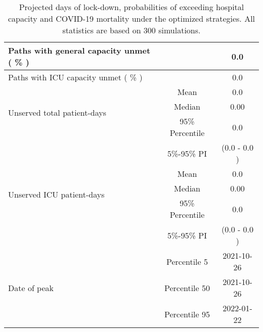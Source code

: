 \documentclass{article}
\begin{document}
\begin{table}[th]
\begin{tabular}{p{4cm}cc}
\multirow{1}{*}{Paths with general capacity unmet ( \% )} &      &         0.0              \\   \midrule 
\multirow{1}{*}{Paths with ICU capacity unmet ( \% )} &      &         0.0              \\   \midrule 
\multirow{3}{\hsize}{Unserved total patient-days} & Mean & 0.0  \\ \cmidrule(l){2-3}
									& Median & 0.00  \\ \cmidrule(l){2-3} 
									& 95\% Percentile     & 0.0    \\ \cmidrule(l){2-3} 
									& 5\%-95\% PI & (0.0 - 0.0 )       \\ \midrule
\multirow{3}{\hsize}{Unserved ICU patient-days} & Mean & 0.0  \\ \cmidrule(l){2-3}
									& Median & 0.00  \\ \cmidrule(l){2-3} 
									& 95\% Percentile     & 0.0    \\ \cmidrule(l){2-3} 
									& 5\%-95\% PI & (0.0 - 0.0 )       \\ \midrule
									
\multirow{3}{\hsize}{Date of peak}   & Percentile 5      & 2021-10-26   \\ \cmidrule(l){2-3} 
                                     & Percentile 50     & 2021-10-26    \\ \cmidrule(l){2-3} 
                                     & Percentile 95     & 2022-01-22     \\  \bottomrule

\end{tabular}
\caption{Projected days of lock-down, probabilities of exceeding hospital capacity and COVID-19 mortality under the optimized strategies. All statistics are based on 300 simulations.}

\label{table:summary_table}
\end{table}
\end{document}
